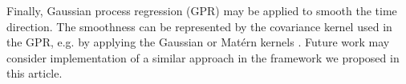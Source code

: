 \documentclass[12pt]{article}
\newcommand{\blind}{1}
\theoremstyle{definition}
\begin{document}
Finally, Gaussian process regression (GPR) may be applied to smooth the time direction. The smoothness can be represented by the covariance kernel used in the GPR, e.g. by applying the Gaussian or Matérn kernels \citep{li2023inference}. Future work may consider implementation of a similar approach in the framework we proposed in this article.






\newpage


\end{document}
